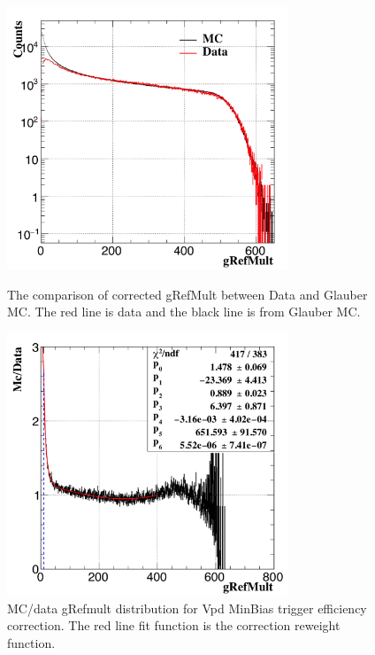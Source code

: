 \begin{figure}[htbp]
\begin{minipage}[htbp]{0.52\linewidth}
\centering
\includegraphics[width=0.75\textwidth]{figure/Run14_D0HFT/MB30_Mc_compare.png}
\caption{The comparison of corrected gRefMult between Data and Glauber MC. The red line is data and the black line is from Glauber MC.\label{fig:McData}}
\end{minipage}
\hfill
\begin{minipage}[htbp]{0.52\linewidth}
\centering
\includegraphics[width=0.75\textwidth]{figure/Run14_D0HFT/MB30_Mc_reweight.png} 
\caption{MC/data gRefmult distribution for Vpd MinBias trigger efficiency correction. The red line fit function is the correction reweight function.\label{fig:vpdEffWeight}}
\end{minipage}
\end{figure}

